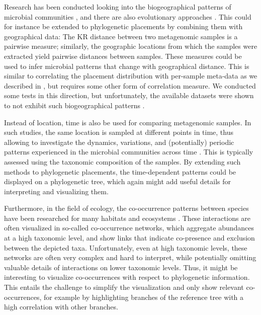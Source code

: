 Research has been conducted looking into the biogeographical patterns of microbial communities
\cite{HughesMartiny2006}, and there are also evolutionary approaches \cite{Cox2016}.
This could for instance be extended to phylogenetic placements by combining them with geographical data:
The KR distance between two metagenomic samples is a pairwise measure;
similarly, the geographic locations from which the samples were extracted yield pairwise distances between samples.
These measures could be used to infer microbial patterns that change with geographical distance.
This is similar to correlating the placement distribution with per-sample meta-data
as we described in ,
but requires some other form of correlation measure.
We conducted some tests in this direction, but unfortunately,
the available datasets were shown to not exhibit such biogeographical patterns \cite{Lentendu2018}.

Instead of location, time is also be used for comparing metagenomic samples.
In such studies, the same location is sampled at different points in time,
thus allowing to investigate the dynamics, variations, and (potentially) periodic patterns
experienced in the microbial communities across time \cite{Costello2009,Faust2015}.
This is typically assessed using the taxonomic composition of the samples.
By extending such methods to phylogenetic placements,
the time-dependent patterns could be displayed on a phylogenetic tree,
which again might add useful details for interpreting and visualizing them.

Furthermore, in the field of ecology, the co-occurrence patterns between species
have been researched for many habitats and ecosystems \cite{Lima-Mendez2015,Villalobos2017,Zelezniak2015}.
These interactions are often visualized in so-called co-occurrence networks,
which aggregate abundances at a high taxonomic level,
and show links that indicate co-presence and exclusion between the depicted taxa.
Unfortunately, even at high taxonomic levels, these networks are often very complex and hard to interpret,
while potentially omitting valuable details of interactions on lower taxonomic levels.
Thus, it might be interesting to visualize co-occurrences with respect to phylogenetic information.
This entails the challenge to simplify the visualization and only show relevant co-occurrences,
for example by highlighting branches of the reference tree with a high correlation with other branches.

